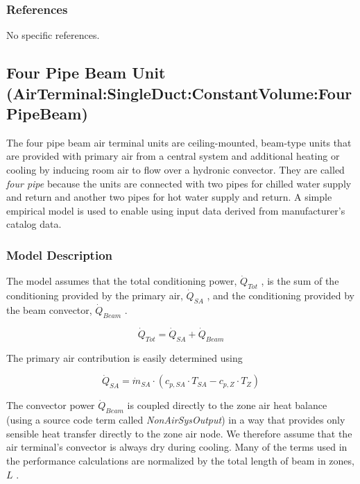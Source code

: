 \subsubsection{References}\label{references-3}

No specific references.

\subsection{Four Pipe Beam Unit (AirTerminal:SingleDuct:ConstantVolume:FourPipeBeam)}\label{four-pipe-beam-unit-airterminalsingleductconstantvolumefourpipebeam}

The four pipe beam air terminal units are ceiling-mounted, beam-type units that are provided with primary air from a central system and additional heating or cooling by inducing room air to flow over a hydronic convector. They are called \emph{four pipe} because the units are connected with two pipes for chilled water supply and return and another two pipes for hot water supply and return. A simple empirical model is used to enable using input data derived from manufacturer's catalog data.

\subsubsection{Model Description}\label{model-description-1-000}

The model assumes that the total conditioning power, \({\dot Q_{Tot}}\) , is the sum of the conditioning provided by the primary air, \({\dot Q_{SA}}\) , and the conditioning provided by the beam convector, \({\dot Q_{Beam}}\) .

\begin{equation}
{\dot Q_{Tot}} = {{\dot Q_{SA}} + {\dot Q_{Beam}}}
\end{equation}

The primary air contribution is easily determined using

\begin{equation}
{\dot Q_{SA}} = {{\dot m_{SA}}\cdot ({c_{p,SA}} \cdot {T_{SA}} - {c_{p,Z}} \cdot {T_{Z}})}
\end{equation}

The convector power \({\dot Q_{Beam}}\) is coupled directly to the zone air heat balance (using a source code term called \emph{NonAirSysOutput}) in a way that provides only sensible heat transfer directly to the zone air node. We therefore assume that the air terminal's convector is always dry during cooling. Many of the terms used in the performance calculations are normalized by the total length of beam in zones, \({L}\) .

